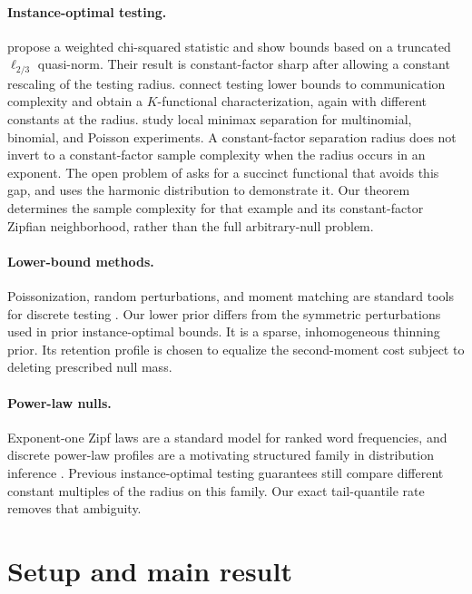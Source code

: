 \documentclass{article}
\newcommand{\1}{\mathbf 1}
\begin{document}
\paragraph{Instance-optimal testing.}
\citet{valiant2017automatic} propose a weighted chi-squared statistic and show bounds based on a truncated $\ell_{2/3}$ quasi-norm. Their result is constant-factor sharp after allowing a constant rescaling of the testing radius. \citet{blais2017distribution} connect testing lower bounds to communication complexity and obtain a $K$-functional characterization, again with different constants at the radius. \citet{chhor2022sharp} study local minimax separation for multinomial, binomial, and Poisson experiments. A constant-factor separation radius does not invert to a constant-factor sample complexity when the radius occurs in an exponent. The open problem of \citet{canonne2024open} asks for a succinct functional that avoids this gap, and uses the harmonic distribution to demonstrate it. Our theorem determines the sample complexity for that example and its constant-factor Zipfian neighborhood, rather than the full arbitrary-null problem.

\paragraph{Lower-bound methods.}
Poissonization, random perturbations, and moment matching are standard tools for discrete testing \citep{paninski2008coincidence,valiant2017automatic}. Our lower prior differs from the symmetric perturbations used in prior instance-optimal bounds. It is a sparse, inhomogeneous thinning prior. Its retention profile is chosen to equalize the second-moment cost subject to deleting prescribed null mass.

\paragraph{Power-law nulls.}
Exponent-one Zipf laws are a standard model for ranked word frequencies, and discrete power-law profiles are a motivating structured family in distribution inference \citep{valiant2021chapter}. Previous instance-optimal testing guarantees still compare different constant multiples of the radius on this family. Our exact tail-quantile rate removes that ambiguity.

\section{Setup and main result}
\end{document}
